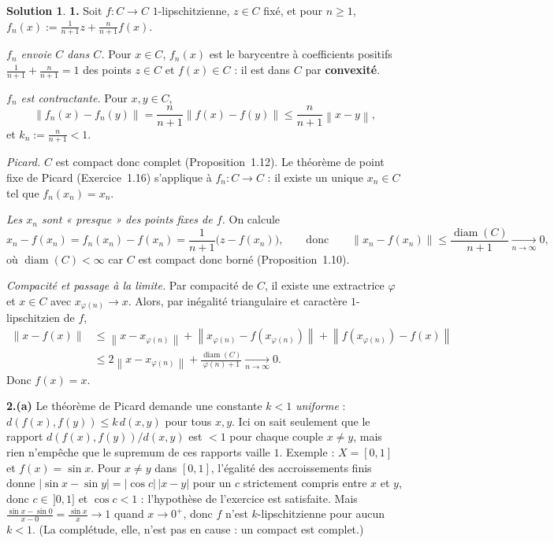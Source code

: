 \documentclass[11pt,a4paper]{article}
\newcommand{\diam}{\operatorname{diam}}
\newcommand{\norm}[1]{\left\|#1\right\|}
\theoremstyle{definition}
\newtheorem*{solution}{Solution}
\begin{document}
\begin{solution}
\noindent\textbf{1.} Soit $f:C\to C$ $1$-lipschitzienne, $z\in C$ fixé, et pour $n\ge1$, $f_n(x):=\frac{1}{n+1}z+\frac{n}{n+1}f(x)$.

\emph{$f_n$ envoie $C$ dans $C$.} Pour $x\in C$, $f_n(x)$ est le barycentre à coefficients positifs $\frac1{n+1}+\frac n{n+1}=1$ des points $z\in C$ et $f(x)\in C$ : il est dans $C$ par \textbf{convexité}.

\emph{$f_n$ est contractante.} Pour $x,y\in C$,
\[
\norm{f_n(x)-f_n(y)}=\frac{n}{n+1}\norm{f(x)-f(y)}\le\frac{n}{n+1}\norm{x-y},
\]
et $k_n:=\frac n{n+1}<1$.

\emph{Picard.} $C$ est compact donc complet (Proposition~1.12). Le théorème de point fixe de Picard (Exercice~1.16) s'applique à $f_n:C\to C$ : il existe un unique $x_n\in C$ tel que $f_n(x_n)=x_n$.

\emph{Les $x_n$ sont « presque » des points fixes de $f$.} On calcule
\[
x_n-f(x_n)=f_n(x_n)-f(x_n)=\frac1{n+1}\big(z-f(x_n)\big),\qquad\text{donc}\qquad
\norm{x_n-f(x_n)}\le\frac{\diam(C)}{n+1}\xrightarrow[n\to\infty]{}0 ,
\]
où $\diam(C)<\infty$ car $C$ est compact donc borné (Proposition~1.10).

\emph{Compacité et passage à la limite.} Par compacité de $C$, il existe une extractrice $\varphi$ et $x\in C$ avec $x_{\varphi(n)}\to x$. Alors, par inégalité triangulaire et caractère $1$-lipschitzien de $f$,
\begin{align*}
\norm{x-f(x)}
&\le\norm{x-x_{\varphi(n)}}+\norm{x_{\varphi(n)}-f(x_{\varphi(n)})}+\norm{f(x_{\varphi(n)})-f(x)}\\
&\le 2\norm{x-x_{\varphi(n)}}+\frac{\diam(C)}{\varphi(n)+1}\xrightarrow[n\to\infty]{}0 .
\end{align*}
Donc $f(x)=x$.

\medskip
\noindent\textbf{2.(a)} Le théorème de Picard demande une constante $k<1$ \emph{uniforme} : $d(f(x),f(y))\le k\,d(x,y)$ pour tous $x,y$. Ici on sait seulement que le rapport $d(f(x),f(y))/d(x,y)$ est $<1$ pour chaque couple $x\ne y$, mais rien n'empêche que le supremum de ces rapports vaille $1$. Exemple : $X=[0,1]$ et $f(x)=\sin x$. Pour $x\ne y$ dans $[0,1]$, l'égalité des accroissements finis donne $|\sin x-\sin y|=|\cos c|\,|x-y|$ pour un $c$ strictement compris entre $x$ et $y$, donc $c\in\,]0,1]$ et $\cos c<1$ : l'hypothèse de l'exercice est satisfaite. Mais $\frac{\sin x-\sin 0}{x-0}=\frac{\sin x}{x}\to1$ quand $x\to0^+$, donc $f$ n'est $k$-lipschitzienne pour aucun $k<1$. (La complétude, elle, n'est pas en cause : un compact est complet.)


\end{solution}
\end{document}
